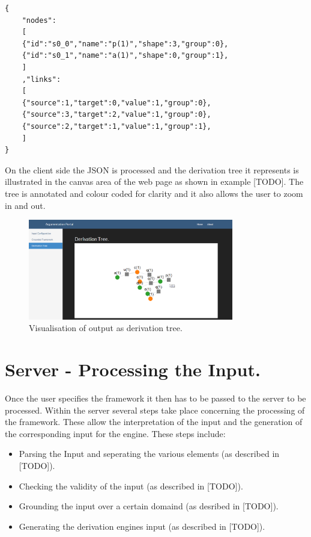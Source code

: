 \begin{Verbatim}[frame=single]
{ 
	"nodes":
	[
	{"id":"s0_0","name":"p(1)","shape":3,"group":0},
	{"id":"s0_1","name":"a(1)","shape":0,"group":1},
	]
	,"links":
	[
	{"source":1,"target":0,"value":1,"group":0},
	{"source":3,"target":2,"value":1,"group":0},
	{"source":2,"target":1,"value":1,"group":1},
	]
}
\end{Verbatim}

On the client side the JSON is processed and the derivation tree it represents is illustrated in the canvas area of the web page as shown in example [TODO]. The tree is annotated and colour coded for clarity and it also allows the user to zoom in and out.

\begin{figure}[h]
    \centering
    \includegraphics[width=0.8\textwidth]{argumentationTree.png}
    \caption{Visualisation of output as derivation tree.}
    \label{fig:arg_tree_soft}
\end{figure}

\section{Server - Processing the Input.}

Once the user specifies the framework it then has to be passed to the server to be processed. Within the server several steps take place concerning the processing of the framework. These allow the interpretation of the input and the generation of the corresponding input for the engine. These steps include:

\begin{itemize}
\item Parsing the Input and seperating the various elements (as described in [TODO]).
\item Checking the validity of the input (as described in [TODO]).
\item Grounding the input over a certain domaind (as desribed in [TODO]).
\item Generating the derivation engines input (as described in [TODO]).
\end{itemize}

